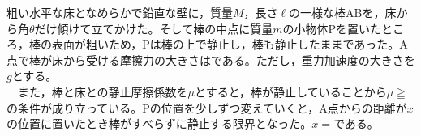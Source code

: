 \hakosyokika
\item
    \begin{mawarikomi}{120pt}{}
    粗い水平な床となめらかで鉛直な壁に，質量$M$，長さ$\ell $の一様な棒ABを，床から角$\theta $だけ傾けて立てかけた。そして棒の中点に質量$m$の小物体Pを置いたところ，棒の表面が粗いため，Pは棒の上で静止し，棒も静止したままであった。A点で棒が床から受ける摩擦力の大きさは\Hako である。ただし，重力加速度の大きさを$g$とする。\\
    ~~また，棒と床との静止摩擦係数を$\mu $とすると，棒が静止していることから$\mu \geqq$\Hako の条件が成り立っている。Pの位置を少しずつ変えていくと，A点からの距離が$x$の位置に置いたとき棒がすべらずに静止する限界となった。$x=$\Hako である。
    \end{mawarikomi}
